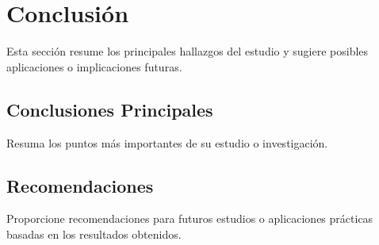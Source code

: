 \section{Conclusión}

Esta sección resume los principales hallazgos del estudio y sugiere posibles aplicaciones o implicaciones futuras.

\subsection{Conclusiones Principales}

Resuma los puntos más importantes de su estudio o investigación. 

\subsection{Recomendaciones}

Proporcione recomendaciones para futuros estudios o aplicaciones prácticas basadas en los resultados obtenidos.
